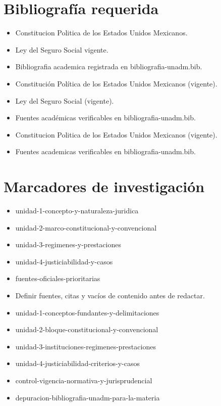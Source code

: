 \documentclass[12pt]{article}
\begin{document}
\section*{Bibliografía requerida}
\begin{itemize}[leftmargin=*]
  \item Constitucion Politica de los Estados Unidos Mexicanos.
  \item Ley del Seguro Social vigente.
  \item Bibliografia academica registrada en bibliografia-unadm.bib.
  \item Constitución Política de los Estados Unidos Mexicanos (vigente).
  \item Ley del Seguro Social (vigente).
  \item Fuentes académicas verificables en bibliografia-unadm.bib.
  \item Constitucion Politica de los Estados Unidos Mexicanos (vigente).
  \item Fuentes academicas verificables en bibliografia-unadm.bib.
\end{itemize}

\section*{Marcadores de investigación}
\begin{itemize}[leftmargin=*]
  \item unidad-1-concepto-y-naturaleza-juridica
  \item unidad-2-marco-constitucional-y-convencional
  \item unidad-3-regimenes-y-prestaciones
  \item unidad-4-justiciabilidad-y-casos
  \item fuentes-oficiales-prioritarias
  \item Definir fuentes, citas y vacíos de contenido antes de redactar.
  \item unidad-1-conceptos-fundantes-y-delimitaciones
  \item unidad-2-bloque-constitucional-y-convencional
  \item unidad-3-instituciones-regimenes-prestaciones
  \item unidad-4-justiciabilidad-criterios-y-casos
  \item control-vigencia-normativa-y-jurisprudencial
  \item depuracion-bibliografia-unadm-para-la-materia
\end{itemize}
\end{document}
